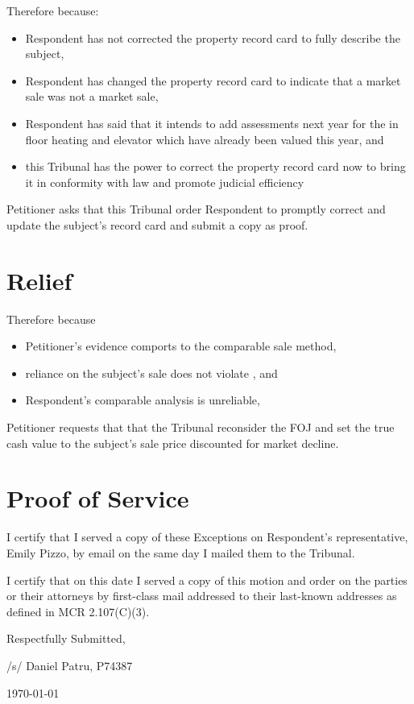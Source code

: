 \documentclass[12pt,\documentclassflag]{michiganCourtOfAppealsBrief}
\begin{document}
Therefore because:

  \begin{itemize}
\item Respondent has not corrected the property record card to fully describe the subject,

\item Respondent has changed the property record card to indicate that a market sale was not a market sale,

\item Respondent has said that it intends to add assessments next year for the in floor heating and elevator which have already been valued this year, and
  
\item this Tribunal has the power to correct the property record card now to bring it in conformity with law and promote judicial efficiency
\end{itemize}
Petitioner asks that this Tribunal order Respondent to promptly correct and update the subject's record card and submit a copy as proof.

\section{Relief}

Therefore because

\begin{itemize}
  \item Petitioner's evidence comports to the comparable sale method,
  \item reliance on the subject's sale does not violate \cite[s]{MCL 211.27(6)}, and
  \item Respondent's comparable analysis is unreliable,
  \end{itemize}
  Petitioner requests that that the Tribunal reconsider the FOJ and set the true cash value to the subject's sale price discounted for market decline.


\section{Proof of Service}

I certify that I served a copy of these Exceptions on Respondent's representative, Emily Pizzo, by email on the same day I mailed them to the Tribunal.

I certify that on this date I served a copy of this motion and order on the parties or their attorneys by first-class mail addressed to
their last-known addresses as defined in MCR 2.107(C)(3).

\vspace{1\baselineskip}

{ \setlength{\leftskip}{3.5in}

  Respectfully Submitted,

  /s/ Daniel Patru, P74387

\today

  \setlength{\leftskip}{0pt}}

\newpage\empty%
\end{document}
